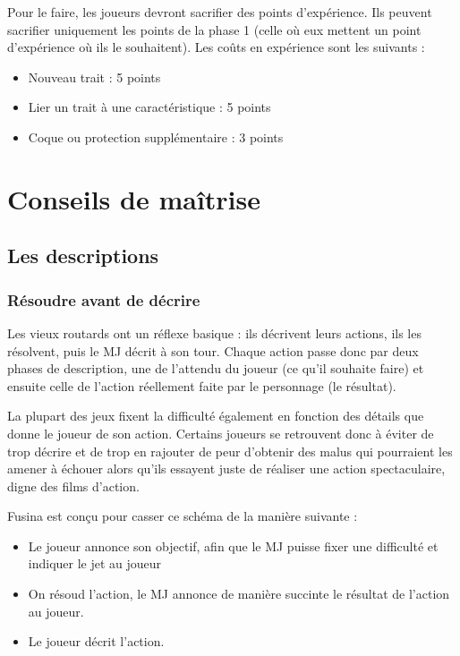 \documentclass{conf/FusinaClass}
\begin{document}
Pour le faire, les joueurs devront sacrifier des points d'expérience. Ils peuvent sacrifier uniquement les points de la phase 1 (celle où eux mettent un point d'expérience où ils le souhaitent). Les coûts en expérience sont les suivants :

\begin{itemize}
\item Nouveau trait : 5 points
\item Lier un trait à une caractéristique : 5 points
\item Coque ou protection supplémentaire : 3 points
\end{itemize}


\part{Conseils de maîtrise}
\chapter{Les descriptions}
\section{Résoudre avant de décrire}
Les vieux routards ont un réflexe basique : ils décrivent leurs actions, ils les résolvent, puis le MJ décrit à son tour. Chaque action passe donc par deux phases de description, une de l'attendu du joueur (ce qu'il souhaite faire) et ensuite celle de l'action réellement faite par le personnage (le résultat). 

La plupart des jeux fixent la difficulté également en fonction des détails que donne le joueur de son action. Certains joueurs se retrouvent donc à éviter de trop décrire et de trop en rajouter de peur d'obtenir des malus qui pourraient les amener à échouer alors qu'ils essayent juste de réaliser une action spectaculaire, digne des films d'action.

Fusina est conçu pour casser ce schéma de la manière suivante :

\begin{itemize}
\item Le joueur annonce son objectif, afin que le MJ puisse fixer une difficulté et indiquer le jet au joueur
\item On résoud l'action, le MJ annonce de manière succinte le résultat de l'action au joueur.
\item Le joueur décrit l'action.
\end{itemize}
\end{document}
